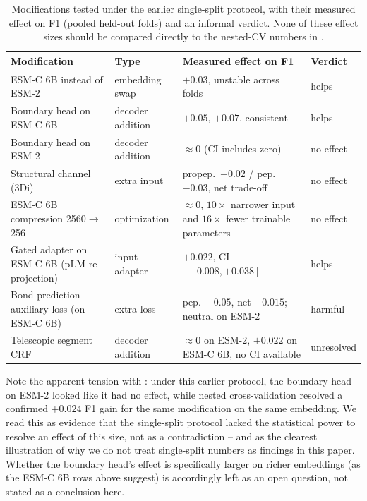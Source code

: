 \documentclass{article}
\begin{document}
\begin{table}[h]
\centering
\caption{Modifications tested under the earlier single-split protocol, with their measured effect on F1 (pooled held-out folds) and an informal verdict. None of these effect sizes should be compared directly to the nested-CV numbers in .}
\label{tab:verdict}
\small
\begin{tabular}{p{3.4cm} p{2.1cm} p{4.6cm} p{1.7cm}}
\toprule
\textbf{Modification} & \textbf{Type} & \textbf{Measured effect on F1} & \textbf{Verdict} \\
\midrule
ESM-C 6B instead of ESM-2 & embedding swap & $+0.03$, unstable across folds & helps \\
Boundary head on ESM-C 6B & decoder addition & $+0.05$, $+0.07$, consistent & helps \\
Boundary head on ESM-2 & decoder addition & $\approx 0$ (CI includes zero) & no effect \\
Structural channel (3Di) & extra input & propep.\ $+0.02$ / pep.\ $-0.03$, net trade-off & no effect \\
ESM-C 6B compression 2560$\to$256 & optimization & $\approx 0$, $10\times$ narrower input and $16\times$ fewer trainable parameters & no effect \\
Gated adapter on ESM-C 6B (pLM re-projection) & input adapter & $+0.022$, CI $[+0.008, +0.038]$ & helps \\
Bond-prediction auxiliary loss (on ESM-C 6B) & extra loss & pep.\ $-0.05$, net $-0.015$; neutral on ESM-2 & harmful \\
Telescopic segment CRF & decoder addition & $\approx 0$ on ESM-2, $+0.022$ on ESM-C 6B, no CI available & unresolved \\
\bottomrule
\end{tabular}
\end{table}

Note the apparent tension with : under this earlier protocol, the boundary head on ESM-2 looked like it had no effect, while nested cross-validation resolved a confirmed $+0.024$ F1 gain for the same modification on the same embedding. We read this as evidence that the single-split protocol lacked the statistical power to resolve an effect of this size, not as a contradiction -- and as the clearest illustration of why we do not treat single-split numbers as findings in this paper. Whether the boundary head's effect is specifically larger on richer embeddings (as the ESM-C 6B rows above suggest) is accordingly left as an open question, not stated as a conclusion here.
\end{document}
